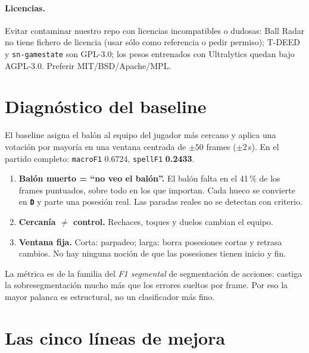 \documentclass[11pt,a4paper]{article}
\newcommand{\lab}[1]{\texttt{\textbf{#1}}}
\begin{document}
\paragraph{Licencias.} Evitar contaminar nuestro repo con licencias incompatibles o dudosas:
Ball Radar no tiene fichero de licencia (usar s\'olo como referencia o pedir permiso); T-DEED y
\texttt{sn-gamestate} son GPL-3.0; los pesos entrenados con Ultralytics quedan bajo AGPL-3.0.
Preferir MIT/BSD/Apache/MPL.

\section{Diagn\'ostico del baseline}

El baseline asigna el bal\'on al equipo del jugador m\'as cercano y aplica una votaci\'on por
mayor\'ia en una ventana centrada de $\pm 50$ frames ($\pm 2$\,s). En el partido completo:
\texttt{macroF1} 0.6724, \texttt{spellF1} \textbf{0.2433}.

\begin{enumerate}
  \item \textbf{Bal\'on muerto = ``no veo el bal\'on''.} El bal\'on falta en el 41\,\% de los frames
        puntuados, sobre todo en los que importan. Cada hueco se convierte en \lab{D} y parte una
        posesi\'on real. Las paradas reales no se detectan con criterio.
  \item \textbf{Cercan\'ia $\neq$ control.} Rechaces, toques y duelos cambian el equipo.
  \item \textbf{Ventana fija.} Corta: parpadeo; larga: borra posesiones cortas y retrasa cambios.
        No hay ninguna noci\'on de que las posesiones tienen inicio y fin.
\end{enumerate}

La m\'etrica es de la familia del \emph{F1 segmental} de segmentaci\'on de acciones: castiga la
sobresegmentaci\'on mucho m\'as que los errores sueltos por frame. Por eso la mayor palanca es
estructural, no un clasificador m\'as fino.

\section{Las cinco l\'ineas de mejora}
\end{document}
